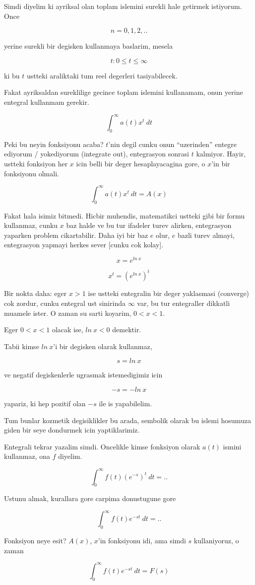 \documentclass[12pt,fleqn]{article}
\begin{document}
Simdi diyelim ki ayriksal olan toplam islemini surekli hale getirmek
istiyorum. Once

\[ n = 0,1,2,.. \]

yerine surekli bir degisken kullanmaya baslarim, mesela

\[ t: 0 \le t \le \infty \]

ki bu $t$ ustteki araliktaki tum reel degerleri tasiyabilecek. 

Fakat ayriksaldan sureklilige gecince toplam islemini kullanamam, onun
yerine entegral kullanmam gerekir. 

\[ \int_0^{\infty} a(t)x^t \ dt \]

Peki bu neyin fonksiyonu acaba? $t$'nin degil cunku onun ``uzerinden''
entegre ediyorum / yokediyorum (integrate out), entegrasyon sonrasi $t$
kalmiyor. Hayir, ustteki fonksiyon her $x$ icin belli bir deger
hesaplayacagina gore, o $x$'in bir fonksiyonu olmali. 

\[ \int_0^{\infty} a(t)x^t \ dt = A(x)\]

Fakat hala isimiz bitmedi. Hicbir muhendis, matematikci ustteki gibi bir
formu kullanmaz, cunku $x$ baz halde ve bu tur ifadeler turev alirken,
entegrasyon yaparken problem cikartabilir. Daha iyi bir baz $e$ olur, $e$
bazli turev almayi, entegrasyon yapmayi herkes sever [cunku cok kolay]. 

\[ x = e^{ln \ x} \]

\[ x^t = (e^{ln \ x})^t \]

Bir nokta daha: eger $x > 1$ ise ustteki entegralin bir deger yaklasmasi
(converge) cok zordur, cunku entegral ust sinirinda $\infty$ var, bu tur
entegraller dikkatli muamele ister. O zaman su sarti koyarim, $0 < x < 1$. 

Eger  $0 < x < 1$ olacak ise, $ln \ x < 0$ demektir. 

Tabii kimse $ln \ x$'i bir degisken olarak kullanmaz, 

\[ s = ln \ x \]

ve negatif degiskenlerle ugrasmak istemedigimiz icin 

\[ -s = -ln \ x \] 

yapariz, ki hep pozitif olan $-s$ ile is yapabilelim. 

Tum bunlar kozmetik degisiklikler bu arada, sembolik olarak bu islemi
hosumuza giden bir seye dondurmek icin yaptiklarimiz. 

Entegrali tekrar yazalim simdi. Oncelikle kimse fonksiyon olarak $a(t)$
ismini kullanmaz, ona $f$ diyelim. 

\[ \int_0^{\infty} f(t)(e^{-s})^t \ dt = ..\]

Ustunu almak, kurallara gore carpima donustugune gore

\[ \int_0^{\infty} f(t)e^{-st} \ dt = ..\]

Fonksiyon neye esit? $A(x)$, $x$'in fonksiyonu idi, ama simdi $s$
kullaniyoruz, o zaman 

\[ \int_0^{\infty} f(t)e^{-st} \ dt = F(s)\]
\end{document}
